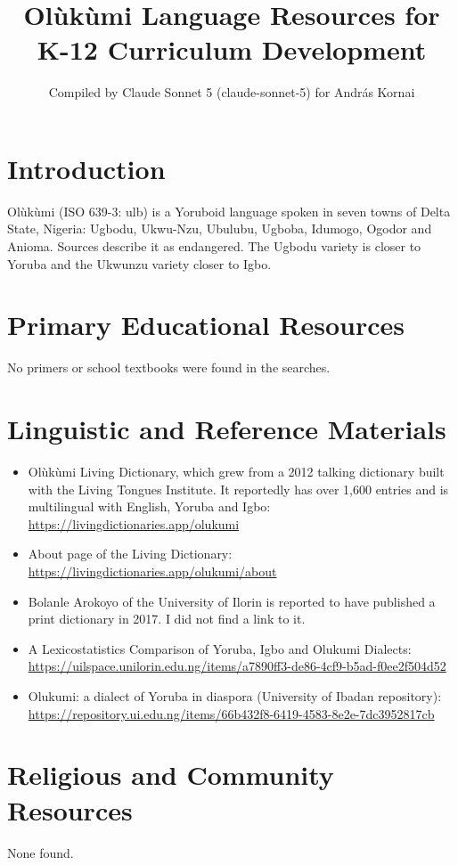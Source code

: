 \documentclass[12pt]{article}
\title{Olùkùmi Language Resources for K-12 Curriculum Development}
\author{Compiled by Claude Sonnet 5 (claude-sonnet-5) for Andr\'as Kornai}
\date{}
\begin{document}
\maketitle

\section{Introduction}
Olùkùmi (ISO 639-3: ulb) is a Yoruboid language spoken in seven towns of Delta State, Nigeria: Ugbodu, Ukwu-Nzu, Ubulubu, Ugboba, Idumogo, Ogodor and Anioma. Sources describe it as endangered. The Ugbodu variety is closer to Yoruba and the Ukwunzu variety closer to Igbo.

\section{Primary Educational Resources}
No primers or school textbooks were found in the searches.

\section{Linguistic and Reference Materials}
\begin{itemize}
\item Olùkùmi Living Dictionary, which grew from a 2012 talking dictionary built with the Living Tongues Institute. It reportedly has over 1,600 entries and is multilingual with English, Yoruba and Igbo: \url{https://livingdictionaries.app/olukumi}
\item About page of the Living Dictionary: \url{https://livingdictionaries.app/olukumi/about}
\item Bolanle Arokoyo of the University of Ilorin is reported to have published a print dictionary in 2017. I did not find a link to it.
\item A Lexicostatistics Comparison of Yoruba, Igbo and Olukumi Dialects: \url{https://uilspace.unilorin.edu.ng/items/a7890ff3-de86-4cf9-b5ad-f0ee2f504d52}
\item Olukumi: a dialect of Yoruba in diaspora (University of Ibadan repository): \url{https://repository.ui.edu.ng/items/66b432f8-6419-4583-8e2e-7dc3952817cb}
\end{itemize}

\section{Religious and Community Resources}
None found.
\end{document}
